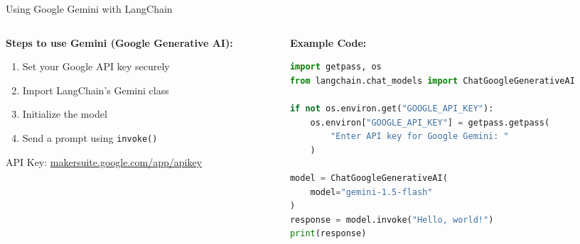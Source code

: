 \documentclass[8pt]{beamer}
\begin{document}
\begin{frame}[fragile]{Using Google Gemini with LangChain}

\begin{columns}

\begin{column}{0.45\textwidth}
\textbf{Steps to use Gemini (Google Generative AI):}
\vspace{0.2cm}

\begin{enumerate}
    \item Set your Google API key securely
    \item Import LangChain's Gemini class
    \item Initialize the model
    \item Send a prompt using \texttt{invoke()}
\end{enumerate}

\vspace{0.2cm}
\scriptsize{
API Key: \href{https://makersuite.google.com/app/apikey}{makersuite.google.com/app/apikey}
}
\end{column}

\begin{column}{0.55\textwidth}
\textbf{Example Code:}
\vspace{0.2cm}

\begin{lstlisting}[language=Python]
import getpass, os
from langchain.chat_models import ChatGoogleGenerativeAI

if not os.environ.get("GOOGLE_API_KEY"):
    os.environ["GOOGLE_API_KEY"] = getpass.getpass(
        "Enter API key for Google Gemini: "
    )

model = ChatGoogleGenerativeAI(
    model="gemini-1.5-flash"
)
response = model.invoke("Hello, world!")
print(response)
\end{lstlisting}
\end{column}

\end{columns}

\end{frame}
\end{document}
